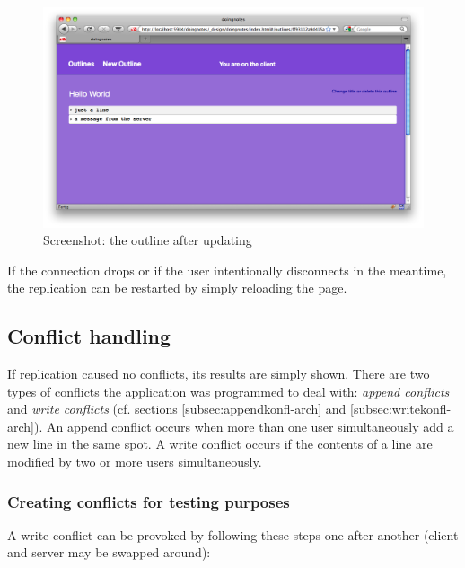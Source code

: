 \medskip
\begin{figure}[ht]
  \begin{center}
  \includegraphics[width=\textwidth]{grafik/screenshot-updated-outline}
  \end{center}
  \caption{Screenshot: the outline after updating}
  \label{fig:outline-updated}
\end{figure}

If the connection drops or if the user intentionally disconnects in the meantime, the replication can be restarted by simply reloading the page.


\afterpage{\clearpage}

\subsection{Conflict handling}
\label{subsec:conflres-anwendung}

If replication caused no conflicts, its results are simply shown. There are two types of conflicts the application was programmed to deal with: \textit{append conflicts} and \textit{write conflicts} (cf. sections \ref{subsec:appendkonfl-arch} and \ref{subsec:writekonfl-arch}). An append conflict occurs when more than one user simultaneously add a new line in the same spot. A write conflict occurs if the contents of a line are modified by two or more users simultaneously.

\subsubsection{Creating conflicts for testing purposes}

A write conflict can be provoked by following these steps one after another (client and server may be swapped around):

